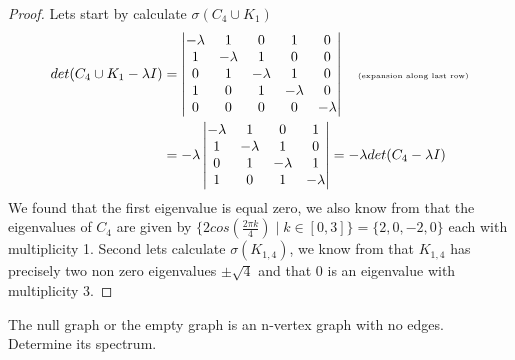 \documentclass[a4paper, 11pt, oneside]{article}
\newenvironment{problem}[1]
  {\renewcommand\theinnercustomprob{#1}\innercustomprob}
  {\endinnercustomprob}
\begin{document}
\begin{proof}
Lets start by calculate $\sigma(C_4\cup K_1)$
\begin{align*}
det (C_4\cup K_1 - \lambda I) &=
\begin{vmatrix}
-\lambda & 1             & 0             & 1                        & 0 \\ 
1             & -\lambda & 1             & 0                         & 0 \\ 
0             & 1             & -\lambda & 1                         & 0 \\ 
1             & 0             & 1             & -\lambda             & 0 \\ 
0             & 0             & 0             & 0                         & -\lambda \\ 
\end{vmatrix}   \quad\text{\tiny{(expansion along last row)}} \\&=
-\lambda
\begin{vmatrix}
-\lambda & 1             & 0             & 1                         \\ 
1             & -\lambda & 1             & 0                          \\ 
0             & 1             & -\lambda & 1                          \\ 
1             & 0             & 1             & -\lambda             \\ 
\end{vmatrix} =-\lambda  det (C_4 - \lambda I)
\end{align*}
We found that the first eigenvalue is equal zero, we also know from \cite[Example 7]{adjacency_matrix} that the eigenvalues of $C_4$ are given by $\{2cos(\frac{2\pi k}{4}) \mid k \in [0, 3]\} = \{ 2, 0, -2, 0 \}$ each with multiplicity 1.
Second lets calculate $\sigma(K_{1,4})$, we know from \cite[Example 9]{adjacency_matrix} that $K_{1,4}$ has precisely two non zero eigenvalues $\pm \sqrt{4}$ and that 0 is an eigenvalue with multiplicity 3.
\end{proof}

\begin{problem}{2.2.1}\label{problem2.2.1}
The null graph or the empty graph is an n-vertex graph with no edges. Determine its spectrum.
\end{problem}
\end{document}
